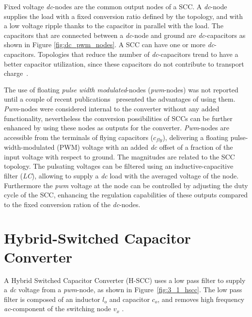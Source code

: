 Fixed voltage \emph{dc}-nodes are the common output nodes of a SCC. A \emph{dc}-node supplies the load with a fixed conversion ratio defined by the topology, and  with a low voltage ripple thanks to the capacitor in parallel with the load. The capacitors that are connected between a \emph{dc}-node and ground are  \emph{dc}-capacitors as shown in Figure \ref{fig:dc_pwm_nodes}. A SCC can have one or more \emph{dc}-capacitors. Topologies that reduce the number of \emph{dc}-capacitors trend to have a better capacitor utilization, since these capacitors do not contribute to transport charge~\cite{Seeman:EECS-2009-78}.

The use of floating \emph{pulse width modulated}-nodes (\emph{pwm}-nodes) was not reported until a couple of recent publications~\cite{2012Kumar, 2012Kline} presented the advantages of using them. \emph{Pwm}-nodes were considered internal to the converter without any added functionality, nevertheless the conversion possibilities of SCCs can be further enhanced by using these nodes as outputs for the converter. \emph{Pwm}-nodes are accessible from the terminals of flying capacitors ($c_{fly}$), delivering a floating pulse-width-modulated (PWM) voltage with an added \emph{dc} offset of a fraction of the input voltage with respect to ground. The magnitudes are related to the SCC topology. The pulsating voltages can be filtered using an inductive-capacitive filter (\emph{LC}), allowing to supply a \emph{dc} load with the averaged voltage of the node. Furthermore the \emph{pwm} voltage at the node can be controlled by adjusting the duty
cycle of the SCC, enhancing the regulation capabilities of these outputs compared to the fixed conversion ration of the \emph{dc}-nodes.

\section{Hybrid-Switched Capacitor Converter}
A Hybrid Switched Capacitor Converter (H-SCC) uses a low pass filter to supply a \emph{dc} voltage from a \emph{pwm}-node, as shown in Figure~\ref{fig:3_1_hscc}. The low pass filter is composed of an inductor $l_o$ and capacitor $c_o$, and removes high frequency \emph{ac}-component of the switching node $v_x$ .

